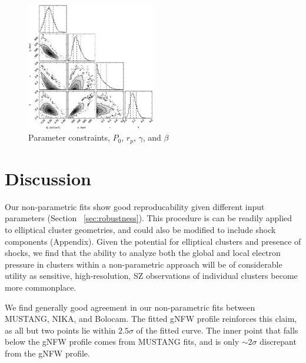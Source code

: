 \documentclass[twocolumn,traditabstract]{aa}
\begin{document}
\begin{figure}[!h]
  \centering
  \includegraphics[width=0.5\textwidth]{NIKA_ml_deproj_figs/Real_Joint_gNFW_Real_11011111_2500S_500B_100W_contour.eps}
  \caption{Parameter constraints, $P_0$, $r_p$, $\gamma$, and $\beta$}
  \label{fig:joint_constraints}
\end{figure}

\section{Discussion}
\label{sec:discussion}

Our non-parametric fits show good reproducability given different input parameters (Section ~\ref{sec:robustness}).
This procedure is can be readily applied to elliptical cluster geometries, and could also be modified
to include shock components (Appendix). Given the potential for elliptical clusters and presence of shocks,
we find that the ability to analyze both the global and local electron pressure in clusters within a
non-parametric approach will be of considerable utility as sensitive, high-resolution,
SZ observations of individual clusters become more commonplace.


We find generally good agreement in our non-parametric fits
between MUSTANG, NIKA, and Bolocam. The fitted gNFW profile reinforces this claim, as all but two points
lie within $2.5\sigma$ of the fitted curve. The inner point that falls below the gNFW profile comes from
MUSTANG fits, and is only $\sim 2\sigma$ discrepant from the gNFW profile.
\end{document}

